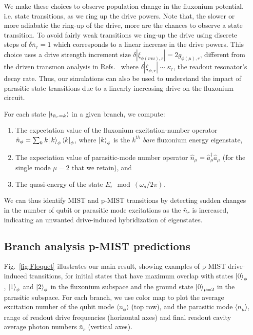 \documentclass[%
reprint,
superscriptaddress,
 amsmath,amssymb,
 aps,
 prx,
longbibliography,
floatfix,
]{revtex4-2}
\begin{document}
We make these choices to observe population change in the fluxonium potential, i.e. state transitions, as we ring up the drive powers. Note that, the slower or more adiabatic the ring-up of the drive, more are the chances to observe a state transition. To avoid fairly weak transitions we ring-up the drive using discrete steps of $\delta \bar n_r=1$ which corresponds to a linear increase in the drive powers. This choice uses a drive strength increment size $\delta 
|{\xi}_{\phi (
mu
),r}|= 2g_{
\phi(\mu),r} 
$, different from the driven transmon analysis in Refs.~\cite{dumas2024unified} where $\delta 
|{\xi}_{\phi,r}|\sim \kappa_r$, the readout resonator's decay rate. Thus, our simulations can also be used to understand the impact of parasitic state transitions due to a linearly increasing drive on the fluxonium circuit.



For each state $\ket{i_{\bar n_r=k}}$ in a given branch, we compute:
\begin{enumerate}
    \item The expectation value of the fluxonium excitation-number operator $\hat n_\phi=\sum_k k\ket{k}_\phi\bra{k}_\phi$,  where $\ket{k}_\phi$ is the $k^{th}$ {\it bare} fluxonium energy eigenstate,
    \item The expectation value of parasitic-mode number operator $\hat n_\mu=\hat a_{\mu}^\dagger \hat a_{\mu}$ (for the single mode $\mu=2$ that we retain), and 
    \item The quasi-energy of the state $E_i \mod (\omega_d/2\pi)$.
\end{enumerate}
We can thus identify MIST and p-MIST transitions by detecting sudden changes in the number of qubit or parasitic mode excitations as the $\bar{n}_r$ is increased, indicating an unwanted drive-induced hybridization of eigenstates.  


\subsection{Branch analysis p-MIST predictions}

Fig.~\ref{fig:Floquet} illustrates our main result, showing examples of p-MIST drive-induced transitions,   
for initial states that have maximum overlap with states $\ket{0}_\phi$, $\ket{1}_\phi$ and $\ket{2}_\phi$ in the fluxonium subspace and the ground state $\ket{0}_{\mu=2}$ in the parasitic subspace. 
For each branch, we use color map to plot the average excitation number of the qubit mode $\langle n_\phi \rangle$ (top row), and the parasitic mode $\langle n_\mu \rangle$, range of readout drive frequencies (horizontal axes) and final readout cavity average photon numbers $ \bar n_r$ (vertical axes). 
\end{document}

